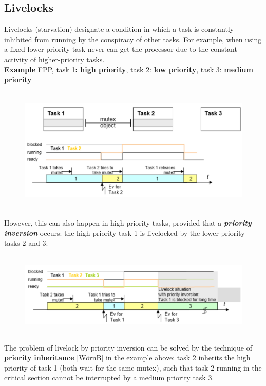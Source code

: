 \subsection{Livelocks}

Livelocks (starvation) designate a condition in which a task is constantly inhibited from running by the conspiracy of other tasks. For example, when using a fixed lower-priority task never can get the processor due to the constant activity of higher-priority tasks.\\

\textbf{Example} FPP, task 1\textbf{: high priority}, task 2:\textbf{ low priority}, task 3:\textbf{ medium priority}

 	\begin{figure}[h]
    \centering
    \includegraphics[width=12cm, height=6cm]{Images/image109.png}
    \label{fig:Fig 55}
    \end{figure}

However, this can also happen in high-priority tasks, provided that a \textbf{\textit{priority inversion}} occurs: the high-priority task 1 is livelocked by the lower priority tasks 2 and 3:

 	\begin{figure}[h]
    \centering
    \includegraphics[width=12cm, height=4cm]{Images/image110.png}
    \label{fig:Fig 56}
    \end{figure}
\newpage
The problem of livelock by priority inversion can be solved by the technique of \textbf{priority} \textbf{inheritance} [W\"{o}rnB]   in the example above: task 2 inherits the high priority of task 1 (both wait for the same mutex), such that task 2 running in the critical section cannot be interrupted by a medium priority task 3. \\

